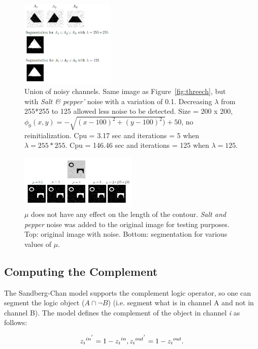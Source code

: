 \documentclass[10pt,twocolumn,letterpaper]{article}
\begin{document}
\begin{figure}[t]
\centering
\includegraphics[width=0.4\textwidth]{sc_noisy.png}
\caption{Union of noisy channels. Same image as Figure~\ref{fig:threech}, but with \textit{Salt \& pepper'} noise with a variation of 0.1. Decreasing $\lambda$
from 255*255 to 125 allowed less
noise to be detected. Size = 200 x 200, $\phi_{0}(x,y) = - \sqrt{(x - 100)^2 + (y - 100)^2)} +
50$, no reinitialization. Cpu = 3.17 sec and iterations = 5 when $\lambda = 255*255$. Cpu = 146.46 sec and iterations = 125 when $\lambda =
125$.}
\label{fig:sc_noisy}
\end{figure}

\begin{figure}[t]
\centering
\includegraphics[width=0.5\textwidth]{cvmu.png}
\caption{$\mu$ does not have any effect on the length of the contour. \textit{Salt and pepper} noise was added to the original image for testing
purposes. Top: original image with noise. Bottom: segmentation for various values of $\mu$.}
\label{fig:cvmu}
\end{figure}

\subsection{Computing the Complement}
The Sandberg-Chan model supports the complement logic operator, so one can segment the logic object ($A \cap \neg B$) (i.e. segment what is in channel A and not
in channel B). The model defines the complement of the object in channel \textit{i} as follows:

\begin{equation}
\label{eqn:complement}
{z_{i}}^{in^{'}} = 1 - {z_{i}}^{in}, \\
{z_{i}}^{out^{'}} = 1 - {z_{i}}^{out}.
\end{equation}
\end{document}

